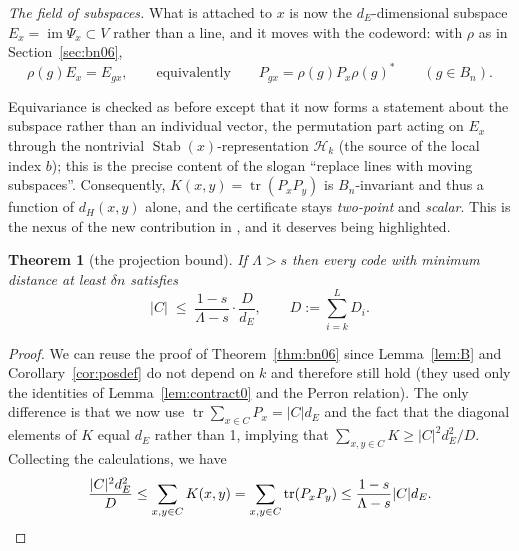 \documentclass[11pt]{amsart}
\newcommand{\graybox}[1]{%
\begin{tcolorbox}[
  width=\linewidth,
  left=1mm,
  right=1mm,
  boxsep=0pt,
  boxrule=0.5pt,
  sharp corners,
  colback=white!95!black]
#1
\end{tcolorbox}
}
\newcommand{\warningsign}{%
  \tikz[baseline=-0.5ex]{
    \node[
      regular polygon,
      regular polygon sides=3,
      draw=black,
      fill=yellow!30,
      line width=1pt,
      minimum size=2.5em,
      inner sep=0pt
    ] {\fontsize{14}{14}\selectfont\bfseries !};
  }%
}
\theoremstyle{plain}
\newtheorem{theorem}{Theorem}[section]
\theoremstyle{remark}
\newcommand{\tr}{\operatorname{tr}}
\newcommand{\Stab}{\operatorname{Stab}}
\newcommand{\cH}{\mathcal H}
\begin{document}
{\em The field of subspaces.} What is attached to $x$ is now the
$d_E$-dimensional subspace $E_x=\operatorname{im}\Psi_x\subset V$ rather than a
line, and it moves with the codeword: with $\rho$ as in
Section~\ref{sec:bn06},
\[
 \rho(g)E_x=E_{gx},\qquad\text{equivalently}\qquad
 P_{gx}=\rho(g)P_x\rho(g)^{*}\qquad(g\in B_n).
\]

\graybox{Equivariance is checked as before except that it now forms a statement about the subspace
rather than an individual vector, the
permutation part acting on $E_x$ through the nontrivial $\Stab(x)$-representation %
$\cH_k$ (the source of the local index $b$); this is the precise content of the slogan
``replace lines with moving subspaces''.  Consequently, $K(x,y)=\tr(P_xP_y)$ is $B_n$-invariant and thus a function of
$d_H(x,y)$ alone, and the certificate stays {\em two-point} and {\em scalar}. This is the nexus of the new contribution in \cite{OAI26}, and it deserves being highlighted. }

\begin{theorem}[the projection bound]\label{thm:proj}
If $\Lambda>s$ then every code with minimum distance at least $\delta n$
satisfies
  \begin{equation}\label{eq: finite bound}
 |C|\;\le\;\frac{1-s}{\Lambda-s}\cdot\frac{D}{d_E},
 \qquad D:=\sum_{i=k}^{L}D_i .
 \end{equation}
\end{theorem}

\begin{proof}
We can reuse the proof of Theorem~\ref{thm:bn06} since Lemma~\ref{lem:B} and
Corollary~\ref{cor:posdef} do not depend on $k$ and therefore still hold 
(they used only the identities of Lemma~\ref{lem:contract0} and the Perron relation). The only difference is that we now use
$\tr\sum_{x\in C}P_x=|C|d_E$ and the fact that the diagonal elements of $K$ equal $d_E$ rather than 1, implying that
$\sum_{x,y\in C}K\ge|C|^2d_E^2/D$. Collecting the calculations, we have
  \begin{equation}\label{eq: mean}
  \frac{|C|^2d_E^2}D\le \sum_{x,y\in C} K(x,y)=\sum_{x,y\in C}\tr(P_x P_y)\le \frac{1-s}{\Lambda -s}|C|d_E. \qedhere
  \end{equation}
\end{proof}
\end{document}
